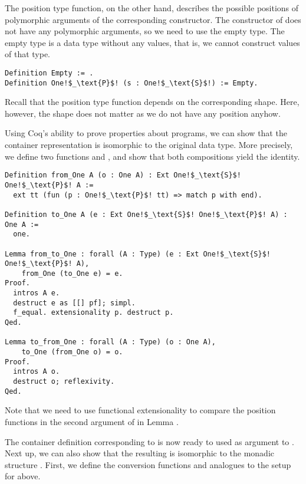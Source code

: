 The position type function, on the other hand, describes the possible positions of polymorphic arguments of the corresponding constructor.
The constructor of  does not have any polymorphic arguments, so we need to use the empty type.
The empty type is a data type without any values, that is, we cannot construct values of that type.

\begin{verbatim}
Definition Empty := .
Definition One!$_\text{P}$! (s : One!$_\text{S}$!) := Empty.
\end{verbatim}

Recall that the position type function depends on the corresponding
shape.
Here, however, the shape does not matter as we do not have any
position anyhow.

Using Coq's ability to prove properties about programs, we can show
that the container representation is isomorphic to the original data
type.
More precisely, we define two functions  and
, and show that both compositions yield the
identity.

\begin{verbatim}
Definition from_One A (o : One A) : Ext One!$_\text{S}$! One!$_\text{P}$! A :=
  ext tt (fun (p : One!$_\text{P}$! tt) => match p with end).

Definition to_One A (e : Ext One!$_\text{S}$! One!$_\text{P}$! A) : One A :=
  one.

Lemma from_to_One : forall (A : Type) (e : Ext One!$_\text{S}$! One!$_\text{P}$! A),
    from_One (to_One e) = e.
Proof.
  intros A e.
  destruct e as [[] pf]; simpl.
  f_equal. extensionality p. destruct p.
Qed.

Lemma to_from_One : forall (A : Type) (o : One A),
    to_One (from_One o) = o.
Proof.
  intros A o.
  destruct o; reflexivity.
Qed.
\end{verbatim}

Note that we need to use functional extensionality to compare the
position functions in the second argument of  in Lemma
.

The container definition corresponding to  is now ready to used as argument to .
Next up, we can also show that the resulting   is isomorphic to the monadic structure .
First, we define the conversion functions  and  analogues to the setup for  above.

